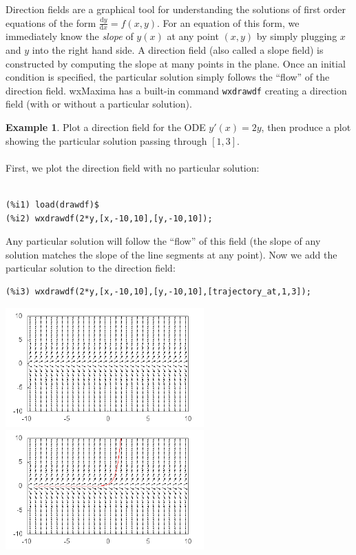 \documentclass[10.5pt,twoside]{report}
\theoremstyle{definition}
\newtheorem{exmp}{Example}[section]
\begin{document}
Direction fields are a graphical tool for understanding the solutions of first order equations of the form $\frac{\mathrm{d}y}{\mathrm{d}x}=f(x,y)$.  For an equation of this form, we immediately know the \textit{slope} of $y(x)$ at any point $(x,y)$ by simply plugging $x$ and $y$ into the right hand side.  A direction field (also called a slope field) is constructed by computing the slope at many points in the plane.  Once an initial condition is specified, the particular solution simply follows the ``flow'' of the direction field.  wxMaxima has a built-in command \verb|wxdrawdf| creating a direction field (with or without a particular solution).

\begin{exmp} Plot a direction field for the ODE $y'(x)=2y$, then produce a plot showing the particular solution passing through $[1,3]$.\\
${}$\\
First, we plot the direction field with no particular solution:

\begin{verbatim}

(%i1) load(drawdf)$
(%i2) wxdrawdf(2*y,[x,-10,10],[y,-10,10]);
\end{verbatim}

Any particular solution will follow the ``flow'' of this field (the slope of any solution matches the slope of the line segments at any point).  Now we add the particular solution to the direction field:

\begin{verbatim}
(%i3) wxdrawdf(2*y,[x,-10,10],[y,-10,10],[trajectory_at,1,3]);
\end{verbatim}


\includegraphics[width=3in]{example_4_4_1_1}
\includegraphics[width=3in]{example_4_4_1_2}
\end{exmp}
\end{document}
